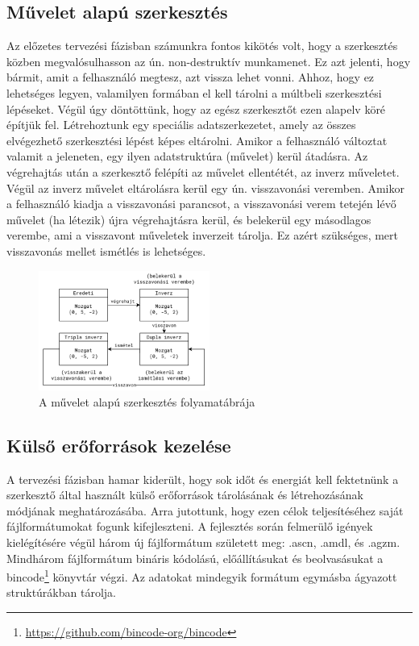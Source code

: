 \pagebreak

\subsection{Művelet alapú szerkesztés}

Az előzetes tervezési fázisban számunkra fontos kikötés volt, hogy a szerkesztés közben
megvalósulhasson az ún. non-destruktív munkamenet. Ez azt jelenti, hogy bármit, amit a felhasználó
megtesz, azt vissza lehet vonni. Ahhoz, hogy ez lehetséges legyen, valamilyen formában el kell
tárolni a múltbeli szerkesztési lépéseket. Végül úgy döntöttünk, hogy az egész szerkesztőt ezen
alapelv köré építjük fel. Létrehoztunk egy speciális adatszerkezetet, amely az összes elvégezhető
szerkesztési lépést képes eltárolni. Amikor a felhasználó változtat valamit a jeleneten, egy
ilyen adatstruktúra (művelet) kerül átadásra. Az végrehajtás után a szerkesztő felépíti az művelet
ellentétét, az inverz műveletet. Végül az inverz művelet eltárolásra kerül egy ún. visszavonási
veremben. Amikor a felhasználó kiadja a visszavonási parancsot, a visszavonási verem tetején lévő
művelet (ha létezik) újra végrehajtásra kerül, és belekerül egy másodlagos verembe, ami a visszavont
műveletek inverzeit tárolja. Ez azért szükséges, mert visszavonás mellet ismétlés is lehetséges.

\begin{figure}[h]
      \centering
      \includegraphics[width=0.5\textwidth]{parts/developer-documentation/editor/images/actions.png}
      \caption{A művelet alapú szerkesztés folyamatábrája}
\end{figure}

\subsection{Külső erőforrások kezelése}

A tervezési fázisban hamar kiderült, hogy sok időt és energiát kell fektetnünk a szerkesztő által
használt külső erőforrások tárolásának és létrehozásának módjának meghatározásába. Arra jutottunk,
hogy ezen célok teljesítéséhez saját fájlformátumokat fogunk kifejleszteni. A fejlesztés során
felmerülő igények kielégítésére végül három új fájlformátum született meg: .ascn, .amdl, és .agzm.
Mindhárom fájlformátum bináris kódolású, előállításukat és beolvasásukat a
bincode\footnote{\url{https://github.com/bincode-org/bincode}}
könyvtár végzi. Az adatokat mindegyik formátum egymásba ágyazott struktúrákban tárolja.

